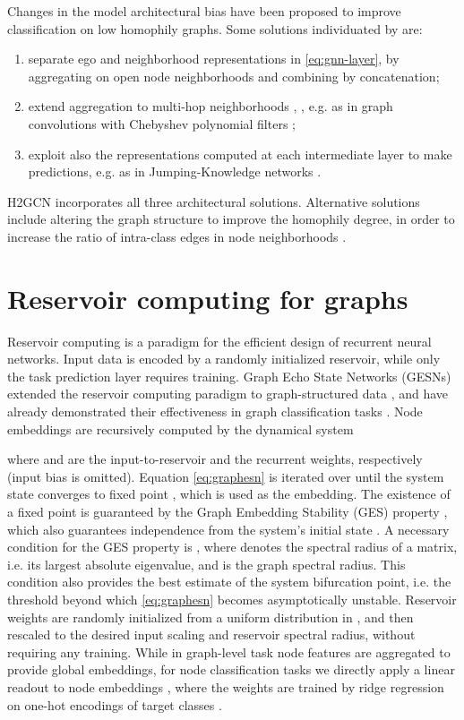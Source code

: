 \documentclass{esannV2p}
\begin{document}
Changes in the model architectural bias have been proposed to improve classification on low homophily graphs.
Some solutions individuated by \cite{Zhu2020} are:
\begin{enumerate}[itemsep=0mm]
  \item separate ego and neighborhood representations in \eqref{eq:gnn-layer}, by aggregating on open node neighborhoods  and combining by concatenation;
  \item extend aggregation to multi-hop neighborhoods , , e.g. as in graph convolutions with Chebyshev polynomial filters \cite{Defferrard2016};
  \item exploit also the representations  computed at each intermediate layer  to make predictions, e.g. as in Jumping-Knowledge networks \cite{Xu2018}.
\end{enumerate}
H2GCN \cite{Zhu2020} incorporates all three architectural solutions.
Alternative solutions include altering the graph structure to improve the homophily degree, in order to increase the ratio of intra-class edges in node neighborhoods \cite{Gasteiger2019,Topping2022}.

\section{Reservoir computing for graphs}\label{sec:graphesn}
Reservoir computing is a paradigm for the efficient design of recurrent neural networks.
Input data is encoded by a randomly initialized reservoir, while only the task prediction layer requires training.
Graph Echo State Networks (GESNs) extended the reservoir computing paradigm to graph-structured data \cite{Gallicchio2010}, and have already demonstrated their effectiveness in graph classification tasks \cite{Gallicchio2020}.
Node embeddings are recursively computed by the dynamical system

where  and  are the input-to-reservoir and the recurrent weights, respectively (input bias is omitted).
Equation \eqref{eq:graphesn} is iterated over  until the system state converges to fixed point , which is used as the embedding.
The existence of a fixed point is guaranteed by the Graph Embedding Stability (GES) property \cite{Gallicchio2020}, which also guarantees independence from the system's initial state .
A necessary condition \cite{Tortorella2022} for the GES property is , where  denotes the spectral radius of a matrix, i.e. its largest absolute eigenvalue, and  is the graph spectral radius.
This condition also provides the best estimate of the system bifurcation point, i.e. the threshold beyond which \eqref{eq:graphesn} becomes asymptotically unstable.
Reservoir weights are randomly initialized from a uniform distribution in , and then rescaled to the desired input scaling and reservoir spectral radius, without requiring any training.
While in graph-level task node features are aggregated to provide global embeddings, for node classification tasks we directly apply a linear readout to node embeddings , where the weights  are trained by ridge regression on one-hot encodings of target classes .
\end{document}
